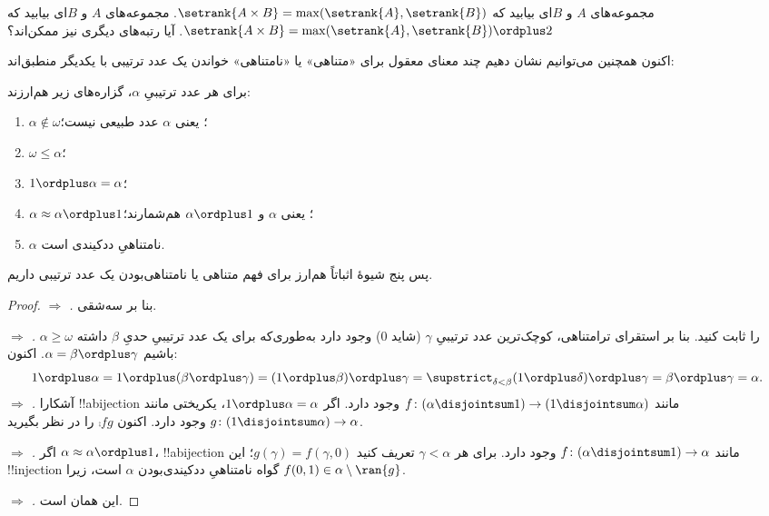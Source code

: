 \documentclass[../../../include/open-logic-section]{subfiles}
\begin{document}
\begin{prob}
مجموعه‌های $A$ و $B$ای بیابید که
$\setrank{A \times B} =
\max(\setrank{A}, \setrank{B})$. مجموعه‌های $A$ و $B$ای بیابید که
$\setrank{A \times B} =
\max(\setrank{A}, \setrank{B}) \ordplus 2$. آیا رتبه‌های دیگری نیز
ممکن‌اند؟
\end{prob}

اکنون همچنین می‌توانیم نشان دهیم چند معنای معقول برای «متناهی» یا
«نامتناهی» خواندن یک عدد ترتیبی با یکدیگر منطبق‌اند:

\begin{lem}
برای هر عدد ترتیبیِ $\alpha$، گزاره‌های زیر هم‌ارزند:
\begin{enumerate}
	\item{} $\alpha\notin \omega$؛ یعنی
	$\alpha$ عدد طبیعی نیست؛
	\item{} $\omega \leq \alpha$؛
	\item{} $1 \ordplus \alpha = \alpha$؛
	\item{} $\alpha \approx \alpha\ordplus 1$؛
	یعنی $\alpha$ و $\alpha\ordplus 1$ هم‌شمارند؛
	\item{} $\alpha$ نامتناهیِ ددکیندی است.
	\end{enumerate}
\end{lem}
\noindent
پس پنج شیوهٔ اثباتاً هم‌ارز برای فهم متناهی یا نامتناهی‌بودن یک عدد
ترتیبی داریم.

\begin{proof}
\emph{ $\Rightarrow$ .}
بنا بر سه‌شقی.

\emph{ $\Rightarrow$ .}
$\alpha \geq \omega$ را ثابت کنید. بنا بر استقرای ترامتناهی، کوچک‌ترین
عدد ترتیبیِ $\gamma$ (شاید $0$) وجود دارد به‌طوری‌که برای یک عدد
ترتیبیِ حدیِ $\beta$ داشته باشیم
$\alpha = \beta \ordplus \gamma$. اکنون:
\[
	1 \ordplus \alpha =
	1 \ordplus (\beta \ordplus \gamma) =
	(1 \ordplus \beta) \ordplus \gamma =
	\supstrict_{\delta < \beta} (1 \ordplus  \delta) \ordplus  \gamma =
	\beta \ordplus  \gamma =
	\alpha.
\]
\emph{ $\Rightarrow$ .}
آشکارا !!a{bijection} مانند
$f \colon (\alpha \disjointsum 1) \to (1 \disjointsum \alpha)$ وجود
دارد. اگر $1 \ordplus \alpha = \alpha$، یکریختی مانند
$g \colon (1 \disjointsum \alpha) \to \alpha$ وجود دارد. اکنون
$\comp{f}{g}$ را در نظر بگیرید.

\emph{ $\Rightarrow$ .}
اگر $\alpha \approx \alpha \ordplus 1$، !!a{bijection} مانند
$f \colon (\alpha \disjointsum 1) \to \alpha$ وجود دارد. برای هر
$\gamma < \alpha$ تعریف کنید
$g(\gamma) = f(\gamma, 0)$؛ این !!{injection} گواه نامتناهیِ
ددکیندی‌بودن $\alpha$ است، زیرا
$f(0,1) \in \alpha \setminus \ran{g}$.

\emph{ $\Rightarrow$ .}
این همان  است.
\end{proof}
\end{document}
